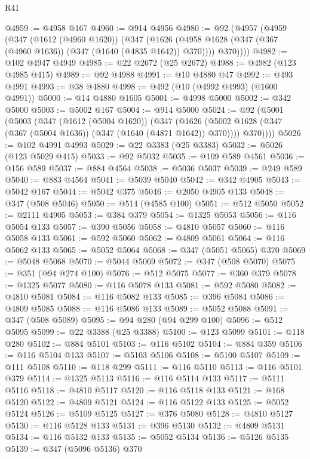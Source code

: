 \begin{lexlean}{R41}
\begin{coremodule}
@4959 := @4958 @167
@4960 := @914 @4956
@4980 := @92
    (@4957
      (@4959
        (@347
          (@1612 (@4960 @1620))
          (@347
            (@1626 (@4958 @1628 (@347 (@367 (@4960 @1636)) (@347 (@1640 (@4835 @1642)) @370))))
            @370))))
@4982 := @102 @4947 @4949
@4985 := @22 @2672 (@25 @2672)
@4988 := @4982 (@123 @4985 @415)
@4989 := @92 @4988
@4991 := @10 @4880 @47
@4992 := @493 @4991
@4993 := @38 @4880
@4998 := @492 (@10 (@4992 @4993) (@1600 @4991))
@5000 := @14 @4880 @1605
@5001 := @4998 @5000
@5002 := @342 @5000
@5003 := @5002 @167
@5004 := @914 @5000
@5024 := @92
    (@5001
      (@5003
        (@347
          (@1612 (@5004 @1620))
          (@347
            (@1626 (@5002 @1628 (@347 (@367 (@5004 @1636)) (@347 (@1640 (@4871 @1642)) @370))))
            @370))))
@5026 := @102 @4991 @4993
@5029 := @22 @3383 (@25 @3383)
@5032 := @5026 (@123 @5029 @415)
@5033 := @92 @5032
@5035 := @109 @589 @4561
@5036 := @156 @589
@5037 := @884 @4564
@5038 := @5036 @5037
@5039 := @249 @589
@5040 := @883 @4564
@5041 := @5039 @5040
@5042 := @342 @4905
@5043 := @5042 @167
@5044 := @5042 @375
@5046 := @2050 @4905 @133
@5048 := @347 (@508 @5046)
@5050 := @514 (@4585 @100)
@5051 := @512 @5050
@5052 := @2111 @4905
@5053 := @384 @379
@5054 := @1325 @5053
@5056 := @116 @5054 @133
@5057 := @390 @5056
@5058 := @4810 @5057
@5060 := @116 @5058 @133
@5061 := @592 @5060
@5062 := @4809 @5061
@5064 := @116 @5062 @133
@5065 := @5052 @5064
@5068 := @347 (@5051 @5065) @370
@5069 := @5048 @5068
@5070 := @5044 @5069
@5072 := @347 (@508 @5070)
@5075 := @351 (@94 @274 @100)
@5076 := @512 @5075
@5077 := @360 @379
@5078 := @1325 @5077
@5080 := @116 @5078 @133
@5081 := @592 @5080
@5082 := @4810 @5081
@5084 := @116 @5082 @133
@5085 := @396 @5084
@5086 := @4809 @5085
@5088 := @116 @5086 @133
@5089 := @5052 @5088
@5091 := @347 (@508 @5089)
@5095 := @94 @280 (@94 @299 @100)
@5096 := @512 @5095
@5099 := @22 @3388 (@25 @3388)
@5100 := @123 @5099
@5101 := @118 @280
@5102 := @884 @5101
@5103 := @116 @5102
@5104 := @884 @359
@5106 := @116 @5104 @133
@5107 := @5103 @5106
@5108 := @5100 @5107
@5109 := @111 @5108
@5110 := @118 @299
@5111 := @116 @5110
@5113 := @116 @5101 @379
@5114 := @1325 @5113
@5116 := @116 @5114 @133
@5117 := @5111 @5116
@5118 := @4810 @5117
@5120 := @116 @5118 @133
@5121 := @168 @5120
@5122 := @4809 @5121
@5124 := @116 @5122 @133
@5125 := @5052 @5124
@5126 := @5109 @5125
@5127 := @376 @5080
@5128 := @4810 @5127
@5130 := @116 @5128 @133
@5131 := @396 @5130
@5132 := @4809 @5131
@5134 := @116 @5132 @133
@5135 := @5052 @5134
@5136 := @5126 @5135
@5139 := @347 (@5096 @5136) @370

\end{coremodule}
\end{lexlean}
